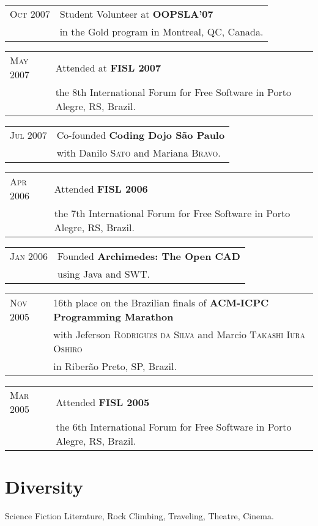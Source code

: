 \documentclass[letter,10pt]{article}
\begin{document}
\begin{tabular}{p{2.5cm}l}
  \textsc{Oct 2007} & Student Volunteer at \textbf{OOPSLA'07}\\
  & in the Gold program in Montreal, QC, Canada.\\
\end{tabular}

\begin{tabular}{p{2.5cm}l}
  \textsc{May 2007} & Attended at \textbf{FISL 2007}\\
  & the 8th International Forum for Free Software in Porto
  Alegre, RS, Brazil.\\
\end{tabular}

\begin{tabular}{p{2.5cm}l}
  \textsc{Jul 2007} & Co-founded \textbf{Coding Dojo São Paulo}\\
  & with Danilo \textsc{Sato} and Mariana \textsc{Bravo}.\\
\end{tabular}

\begin{tabular}{p{2.5cm}l}
  \textsc{Apr 2006} & Attended \textbf{FISL 2006}\\
  & the 7th International Forum for Free Software in Porto
  Alegre, RS, Brazil.\\
\end{tabular}

\begin{tabular}{p{2.5cm}l}
  \textsc{Jan 2006} & Founded \textbf{Archimedes: The Open CAD}\\
  & using Java and SWT.\\
\end{tabular}

\begin{tabular}{p{2.5cm}l}
  \textsc{Nov 2005} & 16th place on the Brazilian finals of \textbf{ACM-ICPC
    Programming Marathon}\\
  & with Jeferson \textsc{Rodrigues da Silva} and Marcio
  \textsc{Takashi Iura Oshiro}\\
  & in Riberão Preto, SP, Brazil.\\
\end{tabular}

\begin{tabular}{p{2.5cm}l}
  \textsc{Mar 2005} & Attended \textbf{FISL 2005}\\
  & the 6th International Forum for Free Software in Porto
  Alegre, RS, Brazil.\\
\end{tabular}

\section{Diversity}

Science Fiction Literature, Rock Climbing, Traveling,
Theatre, Cinema.
\end{document}

